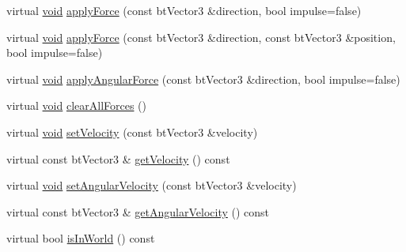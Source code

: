 \begin{DoxyCompactItemize}
\item 
virtual \mbox{\hyperlink{_thread_8h_af1e856da2e658414cb2456cb6f7ebc66}{void}} \mbox{\hyperlink{classnjli_1_1_physics_body_rigid_a48e65253892e04f83648e9e9fde34f69}{apply\+Force}} (const bt\+Vector3 \&direction, bool impulse=false)
\item 
virtual \mbox{\hyperlink{_thread_8h_af1e856da2e658414cb2456cb6f7ebc66}{void}} \mbox{\hyperlink{classnjli_1_1_physics_body_rigid_a905d2e7b94681a30744a32f134611c15}{apply\+Force}} (const bt\+Vector3 \&direction, const bt\+Vector3 \&position, bool impulse=false)
\item 
virtual \mbox{\hyperlink{_thread_8h_af1e856da2e658414cb2456cb6f7ebc66}{void}} \mbox{\hyperlink{classnjli_1_1_physics_body_rigid_ab6ade2b1326ef586c71fa61d49a580b6}{apply\+Angular\+Force}} (const bt\+Vector3 \&direction, bool impulse=false)
\item 
virtual \mbox{\hyperlink{_thread_8h_af1e856da2e658414cb2456cb6f7ebc66}{void}} \mbox{\hyperlink{classnjli_1_1_physics_body_rigid_a7d170e0159d7d8003dd937867dfecbf7}{clear\+All\+Forces}} ()
\item 
virtual \mbox{\hyperlink{_thread_8h_af1e856da2e658414cb2456cb6f7ebc66}{void}} \mbox{\hyperlink{classnjli_1_1_physics_body_rigid_aabbcffe4b49667b4b0d285940c775ced}{set\+Velocity}} (const bt\+Vector3 \&velocity)
\item 
virtual const bt\+Vector3 \& \mbox{\hyperlink{classnjli_1_1_physics_body_rigid_abbd7a0ea7ee539d9b84c64859ddf8406}{get\+Velocity}} () const
\item 
virtual \mbox{\hyperlink{_thread_8h_af1e856da2e658414cb2456cb6f7ebc66}{void}} \mbox{\hyperlink{classnjli_1_1_physics_body_rigid_ab6e5a5e5d9ee063013bb04502508d9ab}{set\+Angular\+Velocity}} (const bt\+Vector3 \&velocity)
\item 
virtual const bt\+Vector3 \& \mbox{\hyperlink{classnjli_1_1_physics_body_rigid_a13bb91357c547d832411c02be5e89260}{get\+Angular\+Velocity}} () const
\item 
virtual bool \mbox{\hyperlink{classnjli_1_1_physics_body_rigid_a0679c29d4447ee758cb84234731dfbdd}{is\+In\+World}} () const
\end{DoxyCompactItemize}
